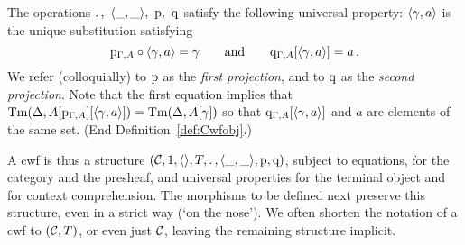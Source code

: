 \documentclass{lmcs}
\begin{document}
\begin{definition}
The operations  ${.\,},~\langle \_,\_ \rangle,~\mathrm{p},~\mathrm{q}$
satisfy the following universal property:
$\langle \gamma, a \rangle$ is the unique substitution satisfying
\[
\mathrm{p}_{\Gamma, A} \circ \langle \gamma, a \rangle = \gamma
\qquad \text{and}\qquad
\mathrm{q}_{\Gamma, A} [\langle \gamma, a \rangle] = a\,.
\]
We refer (colloquially) to $\mathrm{p}$ as the \emph{first projection},
and to $\mathrm{q}$ as the \emph{second projection}. %
{Note that the first equation implies that
$\mathrm{Tm}(\Delta,A[\mathrm{p}_{\Gamma,A}][\langle \gamma, a \rangle]) = \mathrm{Tm}(\Delta,A[\gamma])$
so that $\mathrm{q}_{\Gamma, A} [\langle \gamma, a \rangle]$ and $a$ are elements of the same set.}
(End Definition~\ref{def:Cwfobj}.)
\end{definition}



A cwf is thus a structure $({\mathcal C},1,\langle  \rangle,T,.\, , \langle \_,\_ \rangle,\mathrm{p}, \mathrm{q})$, 
subject to equations, for the category and the presheaf, and universal
properties for the terminal object and for context comprehension. 
The morphisms to be defined next preserve this structure,
even in a strict way (`on the nose').
We often shorten the notation of a cwf to $({\mathcal C},T)$, or even just ${\mathcal C}$, 
leaving the remaining structure implicit.
\end{document}
